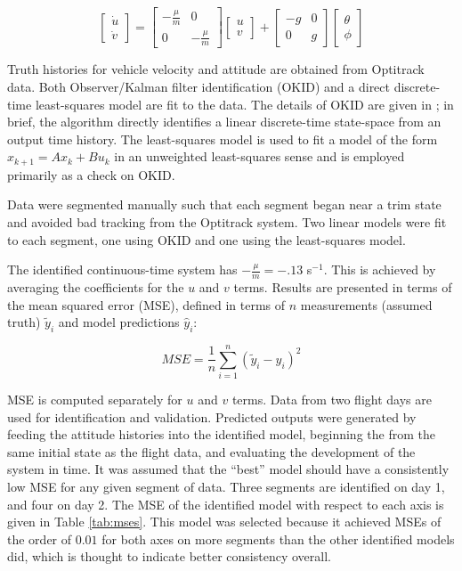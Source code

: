 \documentclass{article}
\begin{document}
\begin{equation}
\begin{bmatrix}
\dot{u} \\
\dot{v}
\end{bmatrix} = \begin{bmatrix}
-\frac{\mu}{m} & 0 \\ 0 & -\frac{\mu}{m}
\end{bmatrix}
\begin{bmatrix}
u \\
v
\end{bmatrix}
+
\begin{bmatrix}
-g & 0 \\
0 & g
\end{bmatrix}
\begin{bmatrix}
\theta \\
\phi
\end{bmatrix}
\end{equation}

Truth histories for vehicle velocity and attitude are obtained from Optitrack data. Both Observer/Kalman filter identification (OKID) and a direct discrete-time least-squares model are fit to the data. The details of OKID are given in \cite{juang1994}; in brief, the algorithm directly identifies a linear discrete-time state-space from an output time history. The least-squares model is used to fit a model of the form $x_{k+1} = Ax_k + Bu_k$ in an unweighted least-squares sense and is employed primarily as a check on OKID.

Data were segmented manually such that each segment began near a trim state and avoided bad tracking from the Optitrack system. Two linear models were fit to each segment, one using OKID and one using the least-squares model.

The identified continuous-time system has $-\frac{\mu}{m} = -.13$ s${}^{-1}$. This is achieved by averaging the coefficients for the $u$ and $v$ terms. Results are presented in terms of the mean squared error (MSE), defined in terms of $n$ measurements (assumed truth) $\tilde{y}_i$ and model predictions $\hat{y}_i$:

\begin{equation}
MSE = \frac{1}{n} \sum_{i=1}^n (\tilde{y}_i-\hat{y}_i)^2
\end{equation}

MSE is computed separately for $u$ and $v$ terms. Data from two flight days are used for identification and validation. Predicted outputs were generated by feeding the attitude histories into the identified model, beginning the from the same initial state as the flight data, and evaluating the development of the system in time. It was assumed that the ``best'' model should have a consistently low MSE for any given segment of data. Three segments are identified on day 1, and four on day 2. The MSE of the identified model with respect to each axis is given in Table \ref{tab:mses}. This model was selected because it achieved MSEs of the order of $0.01$ for both axes on more segments than the other identified models did, which is thought to indicate better consistency overall.
\end{document}
